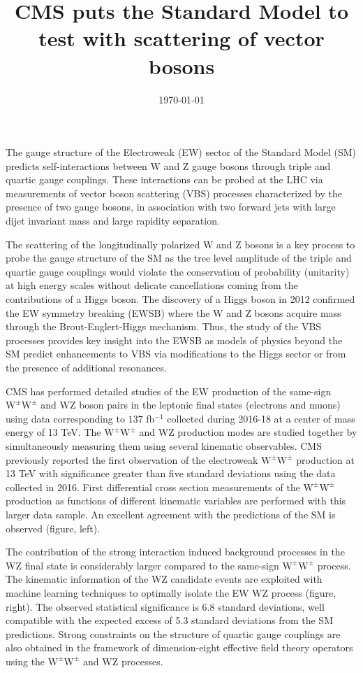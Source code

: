 \documentclass[12pt]{article}
\newcommand{\WZ}{\ensuremath{\mathrm{W}\mathrm{Z}}}
\newcommand{\WW}{\ensuremath{\mathrm{W}^\pm\mathrm{W}^\pm}}
\begin{document}
\title{CMS puts the Standard Model to test with scattering of vector bosons}
\date{\today}
\maketitle

The gauge structure of the Electroweak (EW) sector of the Standard Model (SM) predicts self-interactions between W and Z gauge bosons through triple and quartic gauge couplings. These interactions can be probed at the LHC via measurements of vector boson scattering (VBS) processes characterized by the presence of two gauge bosons, in association with two forward jets with large dijet invariant mass and large rapidity separation. 

The scattering of the longitudinally polarized W and Z bosons is a key process to probe the gauge structure of the SM as the tree level amplitude of the triple and quartic gauge couplings would violate the conservation of probability (unitarity) at high energy scales without delicate cancellations coming from the contributions of a Higgs boson. The discovery of a Higgs boson in 2012 confirmed the EW symmetry breaking (EWSB) where the W and Z bosons acquire mass through the Brout-Englert-Higgs mechanism. Thus, the study of the VBS processes provides key insight into the EWSB as models of physics beyond the SM predict enhancements to VBS via modifications to the Higgs sector or from the presence of additional resonances.

CMS has performed detailed studies of the EW production of the same-sign $\WW$ and $\WZ$ boson pairs in the leptonic final states (electrons and muons) using data corresponding to $137$ fb$^{-1}$ collected during 2016-18 at a center of mass energy of 13 TeV. The $\WW$ and $\WZ$ production modes are studied together by simultaneously measuring them using several kinematic observables. CMS previously reported the first observation of the electroweak $\WW$ production at 13 TeV with significance greater than five standard deviations using the data collected in 2016. First differential cross section measurements of the $\WW$ production as functions of different kinematic variables are performed with this larger data sample. An excellent agreement with the predictions of the SM is observed  (figure, left).

The contribution of the strong interaction induced background processes in the $\WZ$ final state is considerably larger compared to the same-sign $\WW$ process. The kinematic information of the $\WZ$ candidate events are exploited with machine learning techniques to optimally isolate the EW $\WZ$ process (figure, right). The observed statistical significance is 6.8 standard deviations, well compatible with the expected excess of 5.3 standard deviations from the SM predictions. Strong constraints on the structure of quartic gauge couplings are also obtained in the framework of dimension-eight effective field theory operators using the $\WW$ and $\WZ$ processes.
\end{document}
